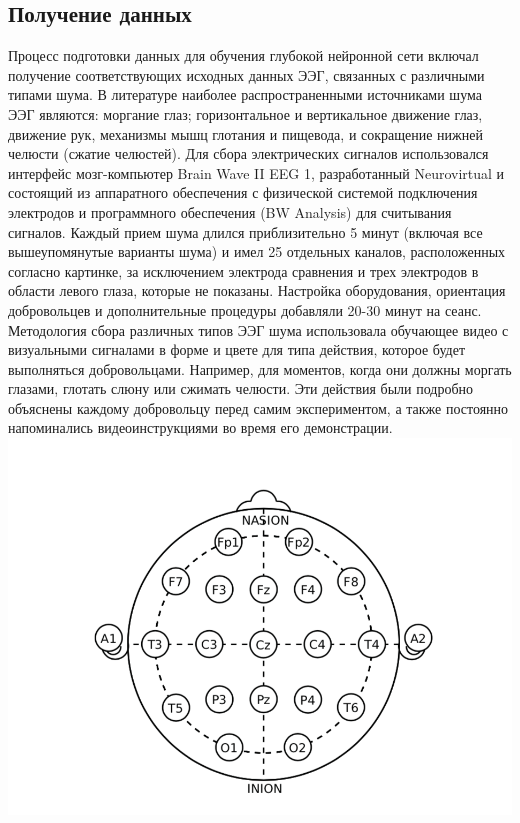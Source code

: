 \documentclass[12pt, a4paper, titlepage]{extreport}
\begin{document}
	\subsection*{Получение данных}
	Процесс подготовки данных для обучения глубокой нейронной сети включал получение соответствующих исходных данных ЭЭГ, связанных с различными типами шума. В литературе наиболее распространенными источниками шума ЭЭГ являются: моргание глаз; горизонтальное и вертикальное движение глаз, движение рук, механизмы мышц глотания и пищевода, и сокращение нижней челюсти (сжатие челюстей).
	Для сбора электрических сигналов использовался интерфейс мозг-компьютер Brain Wave II EEG 1, разработанный Neurovirtual и состоящий из аппаратного обеспечения с физической системой подключения электродов и программного обеспечения (BW Analysis) для считывания сигналов. Каждый прием шума длился приблизительно 5 минут (включая все вышеупомянутые варианты шума) и имел 25 отдельных каналов, расположенных согласно картинке, за исключением электрода сравнения и трех электродов в области левого глаза, которые не показаны. Настройка оборудования, ориентация добровольцев и дополнительные процедуры добавляли 20-30 минут на сеанс.
	Методология сбора различных типов ЭЭГ шума использовала обучающее видео с визуальными сигналами в форме и цвете для типа действия, которое будет выполняться добровольцами. Например, для моментов, когда они должны моргать глазами, глотать слюну или сжимать челюсти. Эти действия были подробно объяснены каждому добровольцу перед самим экспериментом, а также постоянно напоминались видеоинструкциями во время его демонстрации.\\
	\includegraphics[scale=0.5]{electrodes.png}\\
\end{document}
